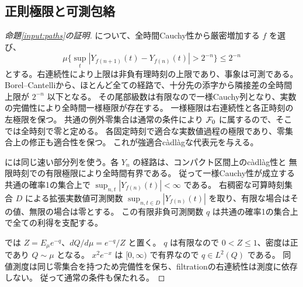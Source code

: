 \subsection{正則極限と可測包絡}
\label{sec:path-inputs}
\begin{proof}[命題\ref{input:paths}の証明]
について、全時間Cauchy性から厳密増加する $f$ を選び、
\[
 \mu\{\sup_t|Y_{f(n+1)}(t)-Y_{f(n)}(t)|>2^{-n}\}\leq2^{-n}
\]
とする。右連続性により上限は非負有理時刻の上限であり、事象は可測である。
Borel--Cantelliから、ほとんど全ての経路で、十分先の添字から隣接差の全時間上限が $2^{-n}$ 以下となる。
その尾部級数は有限なので一様Cauchy列となり、実数の完備性により全時間一様極限が存在する。
一様極限は右連続性と各正時刻の左極限を保つ。
共通の例外零集合は通常の条件により $\mathcal F_0$ に属するので、そこでは全時刻で零と定める。
各固定時刻で適合な実数値過程の極限であり、零集合上の修正も適合性を保つ。
これが強適合càdlàgな代表元を与える。

には同じ速い部分列を使う。各 $Y_n$ の経路は、コンパクト区間上のcàdlàg性と
無限時刻での有限極限により全時間有界である。
従って一様Cauchy性が成立する共通の確率1の集合上で
$\sup_{n,t}|Y_{f(n)}(t)|<\infty$ である。
右稠密な可算時刻集合 $D$ による拡張実数値可測関数
$\sup_{n,t\in D}|Y_{f(n)}(t)|$ を取り、有限な場合はその値、無限の場合は零とする。
この有限非負可測関数 $q$ は共通の確率1の集合上で全ての利得を支配する。

では $Z=E_\mu e^{-q}$、$dQ/d\mu=e^{-q}/Z$ と置く。
$q$ は有限なので $0<Z\leq1$、密度は正であり $Q\sim\mu$ となる。
$x^2e^{-x}$ は $[0,\infty)$ で有界なので $q\in L^2(Q)$ である。
同値測度は同じ零集合を持つため完備性を保ち、filtrationの右連続性は測度に依存しない。
従って通常の条件も保たれる。
\end{proof}
